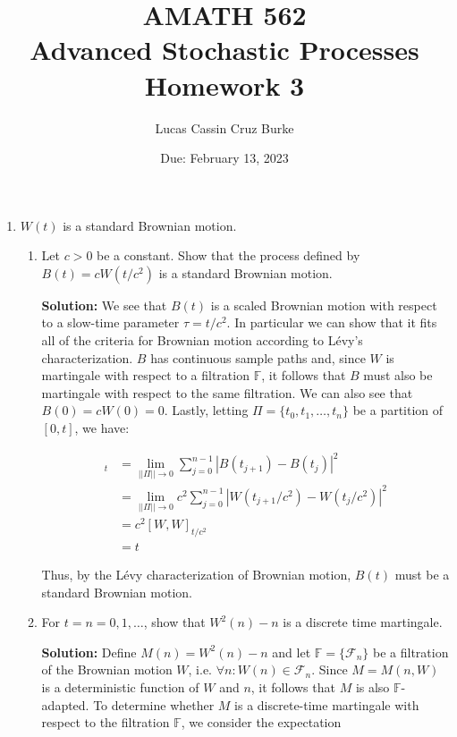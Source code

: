 \documentclass[12pt, a4paper]{article}
\begin{document}
\title{{AMATH 562\\
Advanced Stochastic Processes}\\
{\bf \Huge Homework 3}}

\author{Lucas Cassin Cruz Burke}

\date{Due: February 13, 2023}

\maketitle

\begin{enumerate}

\item $W(t)$ is a standard Brownian motion.
\begin{enumerate}
    \item Let $c>0$ be a constant. Show that the process defined by $B(t)=cW(t/c^2)$ is a standard Brownian motion.

    \textbf{Solution:} We see that $B(t)$ is a scaled Brownian motion with respect to a slow-time parameter $\tau=t/c^2$. In particular we can show that it fits all of the criteria for Brownian motion according to Lévy's characterization. $B$ has continuous sample paths and, since $W$ is martingale with respect to a filtration $\mathbb{F}$, it follows that $B$ must also be martingale with respect to the same filtration. We can also see that $B(0)=cW(0)=0$. Lastly, letting $\Pi=\{t_0,t_1,\dots,t_n\}$ be a partition of $[0,t]$, we have: 

    \begin{align*}
        [B,B]_t&=\lim_{||\Pi||\rightarrow 0} \sum_{j=0}^{n-1}|B(t_{j+1})-B(t_j)|^2 \\&= \lim_{||\Pi||\rightarrow 0} c^2 \sum_{j=0}^{n-1}|W(t_{j+1}/c^2)-W(t_j/c^2)|^2\\&= c^2 [W,W]_{t/c^2}\\&= t
    \end{align*}

    Thus, by the Lévy characterization of Brownian motion, $B(t)$ must be a standard Brownian motion.

    \item For $t=n=0,1,\dots$, show that $W^2(n)-n$ is a discrete time martingale.

    \textbf{Solution:} Define $M(n)=W^2(n)-n$ and let $\mathbb{F}=\{\mathcal{F}_n\}$ be a filtration of the Brownian motion $W$, i.e. $\forall n: W(n) \in \mathcal{F}_n$. Since $M=M(n,W)$ is a deterministic function of $W$ and $n$, it follows that $M$ is also $\mathbb{F}$-adapted. To determine whether $M$ is a discrete-time martingale with respect to the filtration $\mathbb{F}$, we consider the expectation 


\end{enumerate}
\end{enumerate}
\end{document}
